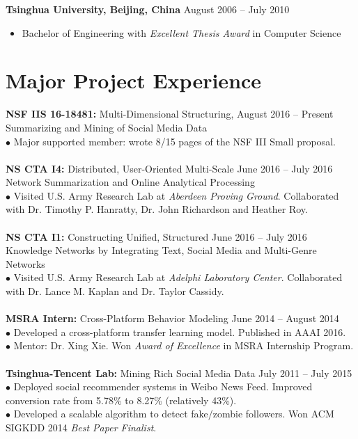 \documentclass[margin, 10pt]{res}
\begin{document}
\begin{resume}
\textbf{Tsinghua University, Beijing, China} \hfill{August 2006 -- July 2010}
\begin{itemize} \itemsep -2pt
\item Bachelor of Engineering with \textit{Excellent Thesis Award} in Computer Science
\end{itemize}


\section{Major Project Experience}

{\textbf{NSF IIS 16-18481:} Multi-Dimensional Structuring,} \hfill{August 2016 -- Present} \\
{Summarizing and Mining of Social Media Data} \\
$\bullet$ Major supported member: wrote 8/15 pages of the NSF III Small proposal. \\ \\
{\textbf{NS CTA I4:} Distributed, User-Oriented Multi-Scale} \hfill{June 2016 -- July 2016} \\
{Network Summarization and Online Analytical Processing} \\
$\bullet$ Visited U.S. Army Research Lab at \textit{Aberdeen Proving Ground}.
Collaborated with Dr. Timothy P. Hanratty, Dr. John Richardson and Heather Roy. \\ \\
{\textbf{NS CTA I1:} Constructing Unified, Structured} \hfill{June 2016 -- July 2016} \\
{Knowledge Networks by Integrating Text, Social Media and Multi-Genre Networks} \hfill{} \\
$\bullet$ Visited U.S. Army Research Lab at \textit{Adelphi Laboratory Center}. Collaborated with Dr. Lance M. Kaplan and Dr. Taylor Cassidy. \\ \\
{\textbf{MSRA Intern:} Cross-Platform Behavior Modeling} \hfill{June 2014 -- August 2014} \\
$\bullet$ Developed a cross-platform transfer learning model. Published in AAAI 2016. \\
$\bullet$ Mentor: Dr. Xing Xie. Won \textit{Award of Excellence} in MSRA Internship Program. \\ \\
{\textbf{Tsinghua-Tencent Lab:} Mining Rich Social Media Data} \hfill{July 2011 -- July 2015} \\
$\bullet$ Deployed social recommender systems in Weibo News Feed. Improved conversion rate from 5.78\% to 8.27\% (relatively 43\%). \\
$\bullet$ Developed a scalable algorithm to detect fake/zombie followers. Won ACM SIGKDD 2014 \textit{Best Paper Finalist}.


\end{resume}
\end{document}
